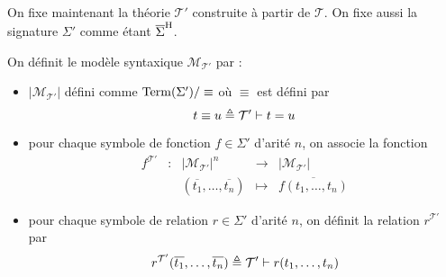 On fixe maintenant la théorie $\mathcal T'$ construite à partir de $\mathcal T$.
On fixe aussi la signature $\Sigma'$ comme étant $\overline{\Sigma}^{\mathrm H}$.

\begin{definition}
  On définit le modèle syntaxique $\mathcal M_{\mathcal T'}$ par :
  \begin{itemize}
  \item $|\mathcal M_{\mathcal T'}|$ défini comme $\operatorname{Term}(\Sigma')/\equiv$ où
    $\equiv$ est défini par
    \[t\equiv u \triangleq \mathcal T'\vdash t = u\]
  \item pour chaque symbole de fonction $f\in\Sigma'$ d'arité $n$, on associe la
    fonction
    \[\begin{array}{ccccc}
    f^{\mathcal T'} & : & |\mathcal M_{\mathcal T'}|^n & \longrightarrow &
    |\mathcal M_{\mathcal T'}|\\
    & & (\overline{t_1},\ldots,\overline{t_n}) & \longmapsto &
    \overline{f(t_1,\ldots,t_n)}
    \end{array}\]
  \item pour chaque symbole de relation $r\in\Sigma'$ d'arité $n$, on définit la
    relation $r^{\mathcal T'}$ par
    \[r^{\mathcal T'}(\overline{t_1},\ldots,\overline{t_n}) \triangleq
    \mathcal T'\vdash r(t_1,\ldots,t_n)\]
  \end{itemize}
\end{definition}

